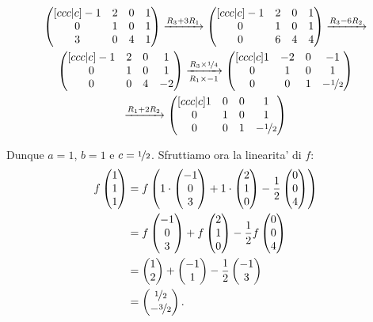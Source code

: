\begin{example}
    \begin{gather*}
        \begin{pmatrix}[ccc|c]
            -1 & 2 & 0 & 1 \\
            0 & 1 & 0 & 1 \\
            3 & 0 & 4 & 1
        \end{pmatrix} \xrightarrow[]{R_3 + 3R_1}
        \begin{pmatrix}[ccc|c]
            -1 & 2 & 0 & 1 \\
            0 & 1 & 0 & 1 \\
            0 & 6 & 4 & 4
        \end{pmatrix} \xrightarrow[]{R_3 - 6R_2}\\
        \begin{pmatrix}[ccc|c]
            -1 & 2 & 0 & 1 \\
            0 & 1 & 0 & 1 \\
            0 & 0 & 4 & -2
        \end{pmatrix} \xrightarrow[R_1 \times -1]{R_3 \times \nicefrac{1}{4}}
        \begin{pmatrix}[ccc|c]
            1 & -2 & 0 & -1 \\
            0 & 1 & 0 & 1 \\
            0 & 0 & 1 & -\nicefrac12
        \end{pmatrix}\\ \xrightarrow[]{R_1 + 2R_2}
        \begin{pmatrix}[ccc|c]
            1 & 0 & 0 & 1 \\
            0 & 1 & 0 & 1 \\
            0 & 0 & 1 & -\nicefrac12
        \end{pmatrix}
    \end{gather*}

    Dunque $a = 1$, $b = 1$ e $c = \nicefrac12$. Sfruttiamo ora la linearita' di $f$: \begin{align*}
        f\begin{pmatrix} 1\\1\\1 \end{pmatrix} &= f\left(1\cdot\begin{pmatrix} -1\\0\\3 \end{pmatrix} + 1\cdot\begin{pmatrix} 2\\1\\0 \end{pmatrix}-\frac12\begin{pmatrix} 0\\0\\4 \end{pmatrix}\right)\\
        &=f\begin{pmatrix} -1\\0\\3 \end{pmatrix} + f\begin{pmatrix} 2\\1\\0 \end{pmatrix}-\frac12f\begin{pmatrix} 0\\0\\4 \end{pmatrix}\\
        &=\begin{pmatrix} 1\\2 \end{pmatrix} + \begin{pmatrix} -1\\1 \end{pmatrix} -\frac12 \begin{pmatrix} -1\\3 \end{pmatrix}\\
        &= \begin{pmatrix} \nicefrac12\\-\nicefrac32 \end{pmatrix}.
    \end{align*}


\end{example}
